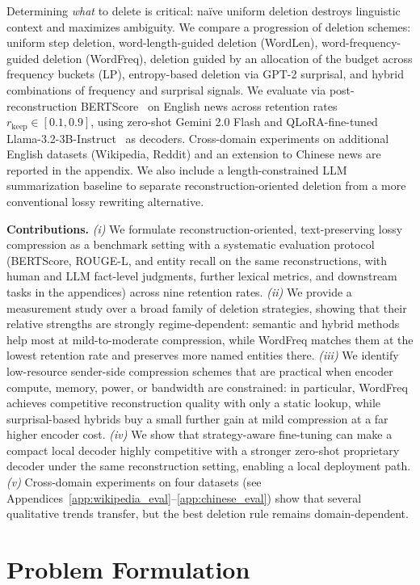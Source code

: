 \documentclass[11pt]{article}
\newcommand{\rkeep}{r_{\mathrm{keep}}}
\begin{document}
Determining \emph{what} to delete is critical: na\"ive uniform deletion destroys linguistic context and maximizes ambiguity. We compare a progression of deletion schemes: uniform step deletion, word-length-guided deletion (WordLen), word-frequency-guided deletion (WordFreq), deletion guided by an allocation of the budget across frequency buckets (LP), entropy-based deletion via GPT-2 surprisal, and hybrid combinations of frequency and surprisal signals.
We evaluate via post-reconstruction BERTScore~\citep{zhang2020bertscore} on English news across retention rates $\rkeep \in [0.1, 0.9]$, using zero-shot Gemini 2.0 Flash and QLoRA-fine-tuned Llama-3.2-3B-Instruct~\citep{dettmers2023qlora} as decoders. Cross-domain experiments on additional English datasets (Wikipedia, Reddit) and an extension to Chinese news are reported in the appendix. We also include a length-constrained LLM summarization baseline to separate reconstruction-oriented deletion from a more conventional lossy rewriting alternative.

\textbf{Contributions.} \textit{(i)} We formulate reconstruction-oriented, text-preserving lossy compression as a benchmark setting with a systematic evaluation protocol (BERTScore, ROUGE-L, and entity recall on the same reconstructions, with human and LLM fact-level judgments, further lexical metrics, and downstream tasks in the appendices) across nine retention rates. \textit{(ii)} We provide a measurement study over a broad family of deletion strategies, showing that their relative strengths are strongly regime-dependent: semantic and hybrid methods help most at mild-to-moderate compression, while WordFreq matches them at the lowest retention rate and preserves more named entities there. \textit{(iii)} We identify low-resource sender-side compression schemes that are practical when encoder compute, memory, power, or bandwidth are constrained: in particular, WordFreq achieves competitive reconstruction quality with only a static lookup, while surprisal-based hybrids buy a small further gain at mild compression at a far higher encoder cost. \textit{(iv)} We show that strategy-aware fine-tuning can make a compact local decoder highly competitive with a stronger zero-shot proprietary decoder under the same reconstruction setting, enabling a local deployment path. \textit{(v)} Cross-domain experiments on four datasets (see Appendices~\ref{app:wikipedia_eval}--\ref{app:chinese_eval}) show that several qualitative trends transfer, but the best deletion rule remains domain-dependent.

\section{Problem Formulation}
\label{sec:problem}
\end{document}
